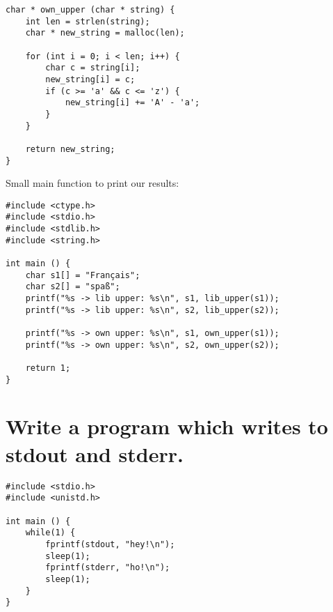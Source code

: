 \pagebreak
{}

\begin{lstlisting}
char * own_upper (char * string) {
    int len = strlen(string);
    char * new_string = malloc(len);

    for (int i = 0; i < len; i++) {
        char c = string[i];
        new_string[i] = c;
        if (c >= 'a' && c <= 'z') {
            new_string[i] += 'A' - 'a';
        }
    }

    return new_string;
}
\end{lstlisting}

Small main function to print our results:
\begin{lstlisting}
#include <ctype.h>
#include <stdio.h>
#include <stdlib.h>
#include <string.h>

int main () {
    char s1[] = "Français";
    char s2[] = "spaß";
    printf("%s -> lib upper: %s\n", s1, lib_upper(s1));
    printf("%s -> lib upper: %s\n", s2, lib_upper(s2));

    printf("%s -> own upper: %s\n", s1, own_upper(s1));
    printf("%s -> own upper: %s\n", s2, own_upper(s2));

    return 1;
}
\end{lstlisting}


%
%
\pagebreak
\section{Write a program which writes to stdout and stderr.}


\begin{lstlisting}
#include <stdio.h>
#include <unistd.h>

int main () {
    while(1) {
        fprintf(stdout, "hey!\n");
        sleep(1);
        fprintf(stderr, "ho!\n");
        sleep(1);
    }
}
\end{lstlisting}



